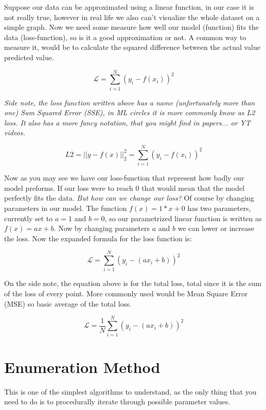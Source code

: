 \documentclass{article}
\begin{document}
    Suppose our data can be approximated using a linear function, in our case it is not really true, however in real life we also can't visualize the whole dataset on a simple graph. Now we need some measure how well our model (function) fits the data (loss-function), so is it a good approximation or not. A common way to measure it, would be to calculate the squared difference between the actual value predicted value.

    \begin{equation}
        \mathcal{L} = \sum_{i=1}^N{(y_i - f(x_i))^2}
    \end{equation}

    \textit{Side note, the loss function written above has a name (unfortunately more than one) Sum Squared Error (SSE), in ML circles it is more commonly know as L2 loss. It also has a more fancy notation, that you might find in papers... or YT videos.}

    \begin{equation}
        L2 = || y - f(x) ||^2_2 = \sum_{i=1}^N{(y_i - f(x_i))^2}
    \end{equation}

    Now as you may see we have our loss-function that represent how badly our model preforms. If our loss were to reach 0 that would mean that the model perfectly fits the data. \textit{But how can we change our loss?} Of course by changing parameters in our model. The function $f(x) = 1 * x + 0$ has two parameters, currently set to $a=1$ and $b=0$, so our parametrized linear function is written as $f(x) = ax+b$. Now by changing parameters $a$ and $b$ we can lower or increase the loss. Now the expanded formula for the loss function is:

    \begin{equation}
        \mathcal{L} = \sum_{i=1}^N{(y_i - (ax_i + b))^2}
    \end{equation}

    On the side note, the equation above is for the total loss, total since it is the sum of the loss of every point. More commonly used would be Mean Square Error (MSE) so basic average of the total loss.

    \begin{equation}
        \mathcal{L} = \frac{1}{N}\sum_{i=1}^N{(y_i - (ax_i + b))^2}
    \end{equation}


    \section{Enumeration Method}
    This is one of the simplest algorithms to understand, as the only thing that you need to do is to procedurally iterate through possible parameter values.\newline
\end{document}
